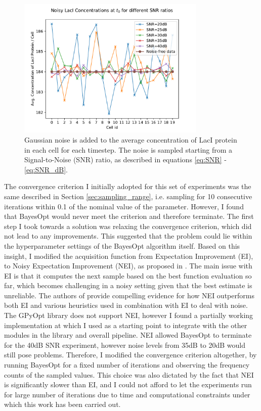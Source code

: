 \documentclass[bsc,frontabs,singlespacing,parskip,deptreport]{infthesis}
\begin{document}
\begin{figure}[h]
    \centering
    \includegraphics[width=0.8\textwidth]{Images/Noise/noisy_data.pdf}
    \caption{Gaussian noise is added to the average concentration of LacI protein in each cell for each timestep. The noise is sampled starting from a Signal-to-Noise (SNR) ratio, as described in equations \ref{eq:SNR} - \ref{eq:SNR_dB}.}
    \label{fig:noise}
\end{figure}

The convergence criterion I initially adopted for this set of experiments was the same described in Section \ref{sec:sampling_range}, i.e. sampling for 10 consecutive iterations within 0.1 of the nominal value of the parameter. However, I found that BayesOpt would never meet the criterion and therefore terminate. The first step I took towards a solution was relaxing the convergence criterion, which did not lead to any improvements. This suggested that the problem could lie within the hyperparameter settings of the BayesOpt algorithm itself. Based on this insight, I modified the acquisition function from Expectation Improvement (EI), to Noisy Expectation Improvement (NEI), as proposed in \cite{https://doi.org/10.48550/arxiv.1706.07094}. The main issue with EI is that it computes the next sample based on the best function evaluation so far, which becomes challenging in a noisy setting given that the best estimate is unreliable. The authors of \cite{https://doi.org/10.48550/arxiv.1706.07094} provide compelling evidence for how NEI outperforms both EI and various heuristics used in combination with EI to deal with noise. The GPyOpt library does not support NEI, however I found a partially working implementation at \cite{NEI} which I used as a starting point to integrate with the other modules in the library and overall pipeline. NEI allowed BayesOpt to terminate for the 40dB SNR experiment, however noise levels from 35dB to 20dB would still pose problems. Therefore, I modified the convergence criterion altogether, by running BayesOpt for a fixed number of iterations and observing the frequency counts of the sampled values. This choice was also dictated by the fact that NEI is significantly slower than EI, and I could not afford to let the experiments run for large number of iterations due to time and computational constraints under which this work has been carried out.
\end{document}
